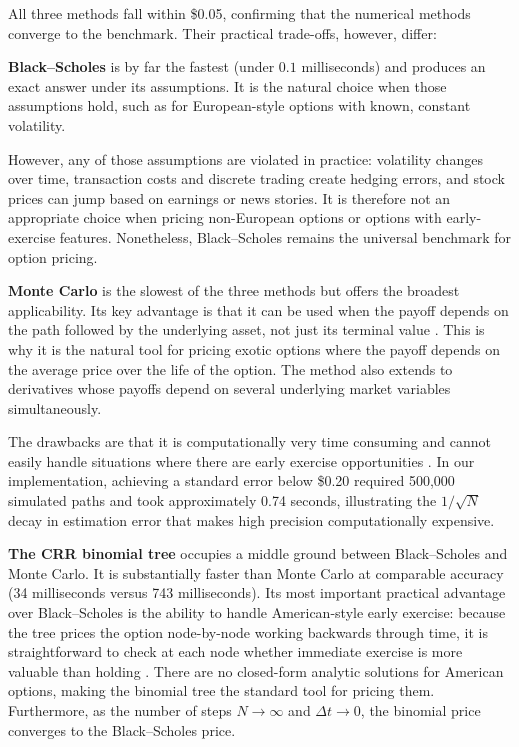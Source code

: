 \documentclass[12pt, a4paper]{article}
\begin{document}
All three methods fall within \$0.05, confirming that the numerical methods converge to the benchmark. Their practical trade-offs, however, differ:
 
\textbf{Black--Scholes} is by far the fastest (under $0.1$ milliseconds) and produces an exact answer under its assumptions. It is the natural choice when those assumptions hold, such as for European-style options with known, constant volatility. 

However, any of those assumptions are violated in practice: volatility changes over time, transaction costs and discrete trading create hedging errors, and stock prices can jump based on earnings or news stories. It is therefore not an appropriate choice when pricing non-European options or options with early-exercise features. Nonetheless, Black--Scholes remains the universal benchmark for option pricing.
 
\textbf{Monte Carlo} is the slowest of the three methods but 
offers the broadest applicability. Its key advantage is that it 
can be used when the payoff depends on the path followed by the 
underlying asset, not just its terminal value \citep[Ch.21]{Hull2022}. This is why it is the natural  tool for pricing exotic options where the payoff depends on the average price over the life of the option. The method also extends to 
derivatives whose payoffs depend on several underlying market 
variables simultaneously. 

The drawbacks are that it is computationally very time consuming and cannot 
easily handle situations where there are early exercise 
opportunities \citep[Ch.21]{Hull2022}. In our implementation, 
achieving a standard error below \$0.20 required 500,000 
simulated paths and took approximately 0.74 seconds, illustrating 
the $1/\sqrt{N}$ decay in estimation error that makes high 
precision computationally expensive.

\textbf{The CRR binomial tree} occupies a middle ground between 
Black--Scholes and Monte Carlo. It is substantially faster than 
Monte Carlo at comparable accuracy (34 milliseconds versus 743 
milliseconds). Its most important practical advantage over 
Black--Scholes is the ability to handle American-style early 
exercise: because the tree prices the option node-by-node 
working backwards through time, it is straightforward to check 
at each node whether immediate exercise is more valuable than 
holding \citep[Ch.21]{Hull2022}. There are no closed-form analytic solutions for American options, making the binomial tree the standard tool for pricing them. Furthermore, as the number of steps 
$N \to \infty$ and $\Delta t \to 0$, the binomial price converges 
to the Black--Scholes price. 
\end{document}
